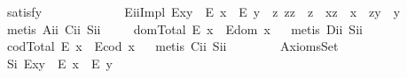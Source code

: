 \begin{isabellebody}
\ {\isacharbrackleft}satisfy{\isacharbrackright}%
\isadelimproof
\ %
\endisadelimproof
%
\isatagproof
{}\isamarkupfalse%
\ \ %
%
\endisatagproof
{\isafoldproof}%
%
\isadelimproof
%
\endisadelimproof
\ \ \ \isanewline
\isanewline
\ \ \ \isamarkupfalse%
\ E\isactrlsub i\isactrlsub iImpl{\isacharcolon}\ {\isachardoublequoteopen}E{\isacharparenleft}x{\isasymcdot}y{\isacharparenright}\ \isactrlbold {\isasymrightarrow}\ {\isacharparenleft}E\ x\ \isactrlbold {\isasymand}\ E\ y\ \isactrlbold {\isasymand}\ {\isacharparenleft}\isactrlbold {\isasymexists}z{\isachardot}\ z{\isasymcdot}z\ {\isasymcong}\ z\ \isactrlbold {\isasymand}\ x{\isasymcdot}z\ {\isasymcong}\ x\ \isactrlbold {\isasymand}\ z{\isasymcdot}y\ {\isasymcong}\ y{\isacharparenright}{\isacharparenright}{\isachardoublequoteclose}%
\isadelimproof
\ %
\endisadelimproof
%
\isatagproof
{}\isamarkupfalse%
\ {\isacharparenleft}metis\ A\isactrlsub i\isactrlsub i\ C\isactrlsub i\isactrlsub i\ S\isactrlsub i\isactrlsub i{\isacharparenright}%
\endisatagproof
{\isafoldproof}%
%
\isadelimproof
%
\endisadelimproof
\isanewline
\ \ \ \isamarkupfalse%
\ domTotal{\isacharcolon}\ {\isachardoublequoteopen}E\ x\ \isactrlbold {\isasymrightarrow}\ E{\isacharparenleft}dom\ x{\isacharparenright}{\isachardoublequoteclose}%
\isadelimproof
\ %
\endisadelimproof
%
\isatagproof
{}\isamarkupfalse%
\ {\isacharparenleft}metis\ D\isactrlsub i\isactrlsub i\ S\isactrlsub i\isactrlsub i{\isacharparenright}%
\endisatagproof
{\isafoldproof}%
%
\isadelimproof
%
\endisadelimproof
\ \isanewline
\ \ \ \isamarkupfalse%
\ codTotal{\isacharcolon}\ {\isachardoublequoteopen}E\ x\ \isactrlbold {\isasymrightarrow}\ E{\isacharparenleft}cod\ x{\isacharparenright}{\isachardoublequoteclose}%
\isadelimproof
\ %
\endisadelimproof
%
\isatagproof
{}\isamarkupfalse%
\ {\isacharparenleft}metis\ C\isactrlsub i\isactrlsub i\ S\isactrlsub i\isactrlsub i{\isacharparenright}%
\endisatagproof
{\isafoldproof}%
%
\isadelimproof
%
\endisadelimproof
\ \ \isanewline
\ \ \isamarkupfalse%
%
\isamarkuptrue%
\ \isamarkupfalse%
\ AxiomsSet{}\isanewline
\ \ \isanewline
\ \ \ \isamarkupfalse%
\ S\isactrlsub i{\isacharcolon}\ {\isachardoublequoteopen}E{\isacharparenleft}x{\isasymcdot}y{\isacharparenright}\ \isactrlbold {\isasymrightarrow}\ {\isacharparenleft}E\ x\ \isactrlbold {\isasymand}\ E\ y{\isacharparenright}{\isachardoublequoteclose}%

\end{isabellebody}
